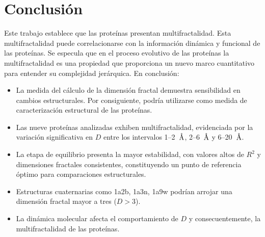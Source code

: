 \chapter{Conclusión}


Este trabajo establece que las proteínas presentan multifractalidad. Esta multifractalidad puede correlacionarse con la información dinámica y funcional de las proteínas. Se especula que en el proceso evolutivo de las prote\'{i}nas la multifractalidad es una propiedad que proporciona un nuevo marco cuantitativo para entender su complejidad jer\'{a}rquica. En conclusión:


\begin{itemize}
	\item La medida del c\'{a}lculo de la dimensi\'{o}n fractal demuestra sensibilidad en
	 cambios estructurales. Por consiguiente, podr\'{i}a utilizarse como medida de caracterizaci\'{o}n 
	 estructural de las prote\'{i}nas.
	
	\item Las nueve prote\'{i}nas analizadas exhiben multifractalidad, evidenciada por la variaci\'{o}n 
	significativa en $D$ entre los intervalos 1--2~$\textup{\r{A}}$, 2--6~$\textup{\r{A}}$ y 6--20~$\textup{\r{A}}$.
	
	\item La etapa de equilibrio presenta la mayor estabilidad, con valores altos de $R^2$ y 
	dimensiones fractales consistentes, constituyendo un punto de referencia \'{o}ptimo para comparaciones estructurales.
	
	\item Estructuras cuaternarias como 1a2b, 1a3n, 1a9w podr\'{i}an arrojar una dimensi\'{o}n fractal mayor a tres ($D>3$).
	
	
	\item La din\'{a}mica molecular afecta el comportamiento de $D$ y consecuentemente, la multifractalidad de las prote\'{i}nas.
\end{itemize}
